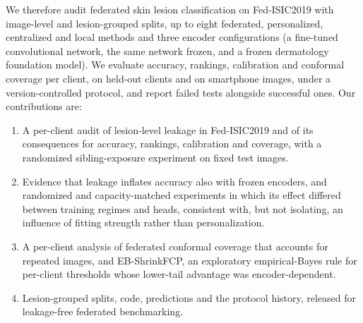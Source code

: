 We therefore audit federated skin lesion classification on Fed-ISIC2019 with image-level and
lesion-grouped splits, up to eight federated, personalized, centralized and local methods and three
encoder configurations (a fine-tuned convolutional network, the same network frozen, and a frozen
dermatology foundation model). We evaluate accuracy, rankings, calibration and conformal coverage per
client, on held-out clients and on smartphone images, under a version-controlled protocol, and report
failed tests alongside successful ones. Our contributions are:
\begin{enumerate}
  \item A per-client audit of lesion-level leakage in Fed-ISIC2019 and of its consequences for accuracy,
    rankings, calibration and coverage, with a randomized sibling-exposure experiment on fixed test images.
  \item Evidence that leakage inflates accuracy also with frozen encoders, and randomized and
    capacity-matched experiments in which its effect differed between training regimes and heads,
    consistent with, but not isolating, an influence of fitting strength rather than personalization.
  \item A per-client analysis of federated conformal coverage that accounts for repeated images, and
    EB-ShrinkFCP, an exploratory empirical-Bayes rule for per-client thresholds whose lower-tail
    advantage was encoder-dependent.
  \item Lesion-grouped splits, code, predictions and the protocol history, released for leakage-free
    federated benchmarking.
\end{enumerate}
